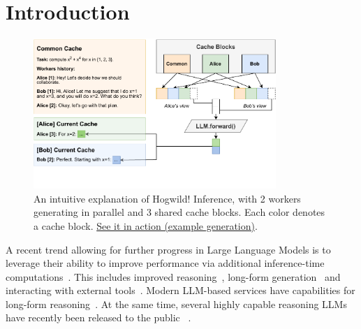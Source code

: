 \vspace{-5px}\section{Introduction}\label{sect:intro}\vspace{-5px}

\begin{figure}[t]
    \centering
    \vspace{-20px}
    \includegraphics[width=0.9\linewidth, height=215px]{resources/figure1_cropped.pdf}\vspace{-20px}
    \caption{An intuitive explanation of Hogwild!\! Inference, with 2 workers generating in parallel and 3 shared cache blocks. Each color denotes a cache block. \href{https://github.com/eqimp/hogwild_llm/tree/main?tab=readme-ov-file\#demo}{See it in action (example generation)}.}
    \label{fig:teaser}\vspace{-20px}
\end{figure}

A recent trend allowing for further progress in Large Language Models is to leverage their ability to improve performance via additional inference-time computations~\citep{challenging_bigbench_solved_with_cot_Suzgun2022ChallengingBT,scaling_test_time_snell2024scaling,beeching2024scalingtesttimecompute,muennighoff2025s1}. This includes improved reasoning~\citep{cot_wei_2022,zero_shot_cot_Kojima2022LargeLM,auto_cot_Zhang2022AutomaticCO,three_of_thought,verify_step_by_step}, long-form generation~\citep{Bai2024LongWriterU1} and interacting with external tools~\citep{Schick2023ToolformerLM,Qin2023ToolLLMFL,Yao2022ReActSR,Shen2023HuggingGPTSA}. Modern LLM-based services have capabilities for long-form reasoning~\citep{openai_o1,googledeepmind2025gemini25thinking,AnthropicClaude3.7Sonnet}. At the same time, several highly capable reasoning LLMs have recently been released to the public ~\cite{deepseek_r1,qwq32b,qwen2,touvron2023llama,dubey2024llama, muennighoff2025s1,ye2025limoreasoning}.

